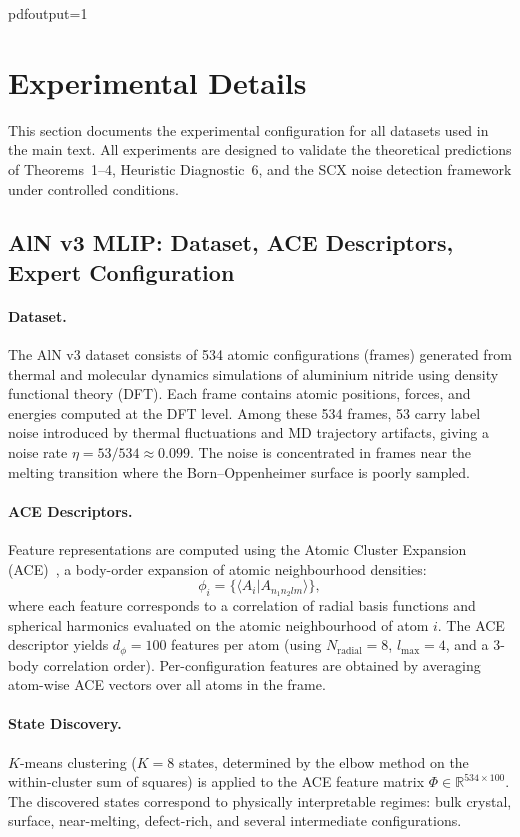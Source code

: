 pdfoutput=1
\section{Experimental Details}

This section documents the experimental configuration for all datasets used in the main text. All experiments are designed to validate the theoretical predictions of Theorems~1--4, Heuristic Diagnostic~6, and the SCX noise detection framework under controlled conditions.

\subsection{AlN v3 MLIP: Dataset, ACE Descriptors, Expert Configuration}

\paragraph{Dataset.}
The AlN v3 dataset consists of 534 atomic configurations (frames) generated from thermal and molecular dynamics simulations of aluminium nitride using density functional theory (DFT). Each frame contains atomic positions, forces, and energies computed at the DFT level. Among these 534 frames, 53 carry label noise introduced by thermal fluctuations and MD trajectory artifacts, giving a noise rate $\eta = 53/534 \approx 0.099$. The noise is concentrated in frames near the melting transition where the Born--Oppenheimer surface is poorly sampled.

\paragraph{ACE Descriptors.}
Feature representations are computed using the Atomic Cluster Expansion (ACE)~\cite{drautz2019ace}, a body-order expansion of atomic neighbourhood densities:
\begin{equation}
\phi_i = \bigl\{ \langle A_i | A_{n_1 n_2 l m} \rangle \bigr\},
\end{equation}
where each feature corresponds to a correlation of radial basis functions and spherical harmonics evaluated on the atomic neighbourhood of atom $i$. The ACE descriptor yields $d_\phi = 100$ features per atom (using $N_{\text{radial}} = 8$, $l_{\max} = 4$, and a 3-body correlation order). Per-configuration features are obtained by averaging atom-wise ACE vectors over all atoms in the frame.

\paragraph{State Discovery.}
$K$-means clustering ($K = 8$ states, determined by the elbow method on the within-cluster sum of squares) is applied to the ACE feature matrix $\Phi \in \mathbb{R}^{534 \times 100}$. The discovered states correspond to physically interpretable regimes: bulk crystal, surface, near-melting, defect-rich, and several intermediate configurations.

